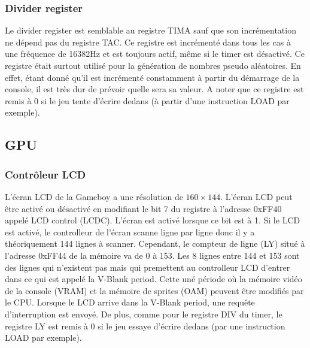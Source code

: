 \documentclass[a4paper]{article}
\begin{document}
\subsubsection{Divider register}
Le divider register est semblable au registre TIMA sauf que son incrémentation
ne dépend pas du registre TAC. Ce registre est incrémenté dans tous les cas à une 
fréquence de 16382Hz et est toujours actif, même si le timer est désactivé. Ce registre
était surtout utilisé pour la génération de nombres pseudo aléatoires. En effet, étant
donné qu'il est incrémenté constamment à partir du démarrage de la console, il
est très dur de prévoir quelle sera sa valeur. A noter que ce registre est remis
à 0 si le jeu tente d'écrire dedans (à partir d'une instruction LOAD par exemple).


\subsection{GPU}
\subsubsection{Contrôleur LCD}
L'écran LCD de la Gameboy a une résolution de $160 \times 144$. L'écran LCD peut
être activé ou désactivé en modifiant le bit 7 du registre à l'adresse 0xFF40 appelé
LCD control (LCDC). L'écran est activé lorsque ce bit est à 1. Si le LCD est activé,
le controlleur de l'écran scanne ligne par ligne donc il y a théoriquement 144 lignes
à scanner. Cependant, le compteur de ligne (LY) situé à l'adresse 0xFF44 de la mémoire
va de 0 à 153. Les 8 lignes entre 144 et 153 sont des lignes qui n'existent pas mais
qui premettent au controlleur LCD d'entrer dans ce qui est appelé la V-Blank period.
Cette uné période où la mémoire vidéo de la console (VRAM) et la mémoire de sprites 
(OAM) peuvent être modifiés par le CPU. Lorsque le LCD arrive dans la V-Blank period,
une requête d'interruption est envoyé. De plus, comme pour le registre DIV du timer,
le registre LY est remis à 0 si le jeu essaye d'écrire dedans (par une instruction 
LOAD par exemple). \\
\end{document}
